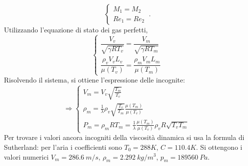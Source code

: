 \begin{equation}
\begin{cases}
 M_1 = M_2 \\
 Re_1 = Re_2  
\end{cases} \ .
\end{equation}
Utilizzando l'equazione di stato dei gas perfetti,
\begin{equation}
\begin{cases}
 \dfrac{V_v}{\sqrt{\gamma R T_v}} = \dfrac{V_m}{\sqrt{\gamma R T_m}} \\
 \dfrac{\rho_v V_v L_v}{\mu(T_v)} = \dfrac{\rho_m V_m L_m}{\mu(T_m)}
\end{cases}
\end{equation}
Risolvendo il sistema, si ottiene l'espressione delle incognite:
\begin{equation}
 \Rightarrow
   \begin{cases}
     V_m = V_v \sqrt{\frac{T_m}{T_v}} \\
     \rho_m = \frac{1}{\lambda} \rho_v \sqrt{\frac{T_v}{T_m}}
     \frac{\mu(T_m)}{\mu(T_v)} \\
     P_m = \rho_m R T_m = \frac{1}{\lambda} \frac{\mu(T_m)}{\mu(T_v)} \rho_v R \sqrt{T_v T_m}
   \end{cases}
\end{equation}
Per trovare i valori ancora incogniti della viscosità dinamica si usa la formula di Sutherland: per l'aria i coefficienti sono $T_0 = 288 K$, $C = 110.4 K$.
Si ottengono i valori numerici $V_m = 286.6 \ m/s$, $\rho_m = 2.292 \ kg/m^3$, $p_m = 189560 \ Pa$.




